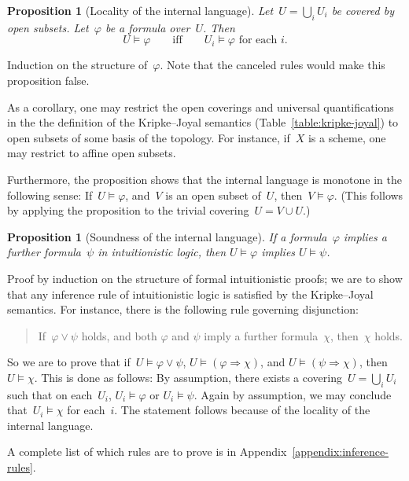 \documentclass[10pt,reqno,a4paper]{amsbook}
\makeatletter
\theoremstyle{definition}
\theoremstyle{plain}
\newtheorem{prop}[defn]{Proposition}
\theoremstyle{remark}
\newcommand{\?}{\,{:}\,}
\renewcommand{\_}{\mathpunct{.}\,}
\renewenvironment{proof}[1][\proofname]{\par
  \pushQED{\qed}%
  \normalfont \topsep6\p@\@plus6\p@\relax
  \trivlist
  \item[\hskip\labelsep
        \itshape
    #1\@addpunct{.}]\ignorespaces
}{%
  \popQED\endtrivlist\@endpefalse
}
\makeatother
\begin{document}
\begin{prop}[Locality of the internal language]
\label{prop:locality-of-the-internal-language}
Let~$U = \bigcup_i U_i$ be covered by open subsets. Let~$\varphi$
be a formula over~$U$. Then
\[ U \models \varphi \qquad\text{iff}\qquad
  \text{$U_i \models \varphi$ for each $i$}. \]
\end{prop}
\begin{proof}Induction on the structure of~$\varphi$. Note that the canceled
rules would make this proposition false.\end{proof}

As a corollary, one may restrict the open coverings and universal
quantifications in the the definition of the Kripke--Joyal semantics
(Table~\ref{table:kripke-joyal}) to open subsets of some basis of the topology.
For instance, if~$X$ is a scheme, one may restrict to affine open subsets.

Furthermore, the proposition shows that the internal language is monotone in
the following sense: If~$U \models \varphi$, and~$V$ is an open subset of~$U$,
then~$V \models \varphi$. (This follows by applying the proposition to the
trivial covering~$U = V \cup U$.)

\begin{prop}[Soundness of the internal language]
\label{prop:soundness-of-the-internal-language}
If a formula~$\varphi$ implies a further formula~$\psi$ in intuitionistic logic, then
$U \models \varphi$ implies $U \models \psi$.
\end{prop}
\begin{proof}
Proof by induction on the structure of formal intuitionistic proofs; we are to
show that any inference rule of intuitionistic logic is satisfied by the
Kripke--Joyal semantics. For instance, there is the following rule governing
disjunction:
\begin{quote}
If~$\varphi \vee \psi$ holds, and both $\varphi$ and $\psi$ imply a further
formula~$\chi$, then~$\chi$ holds.
\end{quote}
So we are to prove that if~$U \models \varphi \vee \psi$, $U \models (\varphi
\Rightarrow \chi)$, and $U \models (\psi \Rightarrow \chi)$, then $U \models \chi$.
This is done as follows: By assumption, there exists a covering~$U = \bigcup_i
U_i$ such that on each~$U_i$, $U_i \models \varphi$ or $U_i \models \psi$.
Again by assumption, we may conclude that~$U_i \models \chi$ for each~$i$. The statement
follows because of the locality of the internal language.

A complete list of which rules are to prove is
in Appendix~\ref{appendix:inference-rules}.
\end{proof}
\end{document}
